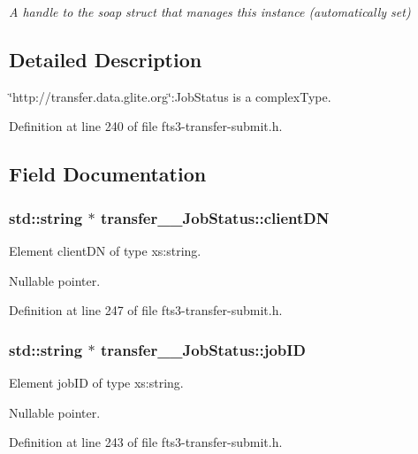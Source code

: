 \begin{DoxyCompactItemize}
\begin{DoxyCompactList}\small\item\em A handle to the soap struct that manages this instance (automatically set) \item\end{DoxyCompactList}\end{DoxyCompactItemize}


\subsection{Detailed Description}
\char`\"{}http://transfer.data.glite.org\char`\"{}:JobStatus is a complexType. 

Definition at line 240 of file fts3-\/transfer-\/submit.h.



\subsection{Field Documentation}
\subsubsection[{clientDN}]{\setlength{\rightskip}{0pt plus 5cm}std::string $\ast$ {\bf transfer\_\-\_\-JobStatus::clientDN}}\label{classtransfer____JobStatus_a61202a8e6fd62cd46631b7001981931e}


Element clientDN of type xs:string. 

Nullable pointer. 

Definition at line 247 of file fts3-\/transfer-\/submit.h.

\subsubsection[{jobID}]{\setlength{\rightskip}{0pt plus 5cm}std::string $\ast$ {\bf transfer\_\-\_\-JobStatus::jobID}}\label{classtransfer____JobStatus_af0df3912849c67971cd3148872b8016a}


Element jobID of type xs:string. 

Nullable pointer. 

Definition at line 243 of file fts3-\/transfer-\/submit.h.

